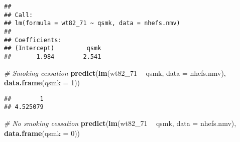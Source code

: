 \documentclass[10pt,]{book}
\newenvironment{Shaded}{\begin{snugshade}}{\end{snugshade}}
\newcommand{\CommentTok}[1]{\textcolor[rgb]{0.56,0.35,0.01}{\textit{#1}}}
\newcommand{\DataTypeTok}[1]{\textcolor[rgb]{0.13,0.29,0.53}{#1}}
\newcommand{\DecValTok}[1]{\textcolor[rgb]{0.00,0.00,0.81}{#1}}
\newcommand{\KeywordTok}[1]{\textcolor[rgb]{0.13,0.29,0.53}{\textbf{#1}}}
\newcommand{\NormalTok}[1]{#1}
\newcommand{\OperatorTok}[1]{\textcolor[rgb]{0.81,0.36,0.00}{\textbf{#1}}}
\newcommand{\StringTok}[1]{\textcolor[rgb]{0.31,0.60,0.02}{#1}}
\begin{document}
\begin{Shaded}
\end{Shaded}

\begin{verbatim}
## 
## Call:
## lm(formula = wt82_71 ~ qsmk, data = nhefs.nmv)
## 
## Coefficients:
## (Intercept)         qsmk  
##       1.984        2.541
\end{verbatim}

\begin{Shaded}
\begin{Highlighting}[]
\CommentTok{# Smoking cessation}
\KeywordTok{predict}\NormalTok{(}\KeywordTok{lm}\NormalTok{(wt82_}\DecValTok{71} \OperatorTok{~}\StringTok{ }\NormalTok{qsmk, }\DataTypeTok{data =}\NormalTok{ nhefs.nmv), }\KeywordTok{data.frame}\NormalTok{(}\DataTypeTok{qsmk =} \DecValTok{1}\NormalTok{))}
\end{Highlighting}
\end{Shaded}

\begin{verbatim}
##        1 
## 4.525079
\end{verbatim}

\begin{Shaded}
\begin{Highlighting}[]
\CommentTok{# No smoking cessation}
\KeywordTok{predict}\NormalTok{(}\KeywordTok{lm}\NormalTok{(wt82_}\DecValTok{71} \OperatorTok{~}\StringTok{ }\NormalTok{qsmk, }\DataTypeTok{data =}\NormalTok{ nhefs.nmv), }\KeywordTok{data.frame}\NormalTok{(}\DataTypeTok{qsmk =} \DecValTok{0}\NormalTok{)) }
\end{Highlighting}
\end{Shaded}
\end{document}
